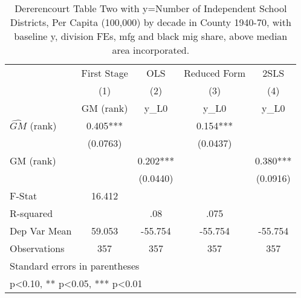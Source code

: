 \begin{table}[htbp]\centering
\def\sym#1{\ifmmode^{#1}\else\(^{#1}\)\fi}
\caption{Dererencourt Table Two with y=Number of Independent School Districts, Per Capita (100,000) by decade in County 1940-70, with baseline y, division FEs, mfg and black mig share, above median area incorporated.}
\begin{tabular}{l*{4}{c}}
\toprule
                    & First Stage   &         OLS   &Reduced Form   &        2SLS   \\
                    &\multicolumn{1}{c}{(1)}&\multicolumn{1}{c}{(2)}&\multicolumn{1}{c}{(3)}&\multicolumn{1}{c}{(4)}\\
                    &\multicolumn{1}{c}{GM  (rank)}&\multicolumn{1}{c}{y\_L0}&\multicolumn{1}{c}{y\_L0}&\multicolumn{1}{c}{y\_L0}\\
\midrule
$\hat{GM}$ (rank)   &       0.405***&               &       0.154***&               \\
                    &    (0.0763)   &               &    (0.0437)   &               \\
\addlinespace
GM  (rank)          &               &       0.202***&               &       0.380***\\
                    &               &    (0.0440)   &               &    (0.0916)   \\
\midrule
F-Stat              &      16.412   &               &               &               \\
R-squared           &               &         .08   &        .075   &               \\
Dep Var Mean        &      59.053   &     -55.754   &     -55.754   &     -55.754   \\
Observations        &         357   &         357   &         357   &         357   \\
\bottomrule
\multicolumn{5}{l}{\footnotesize Standard errors in parentheses}\\
\multicolumn{5}{l}{\footnotesize * p<0.10, ** p<0.05, *** p<0.01}\\
\end{tabular}
\end{table}
